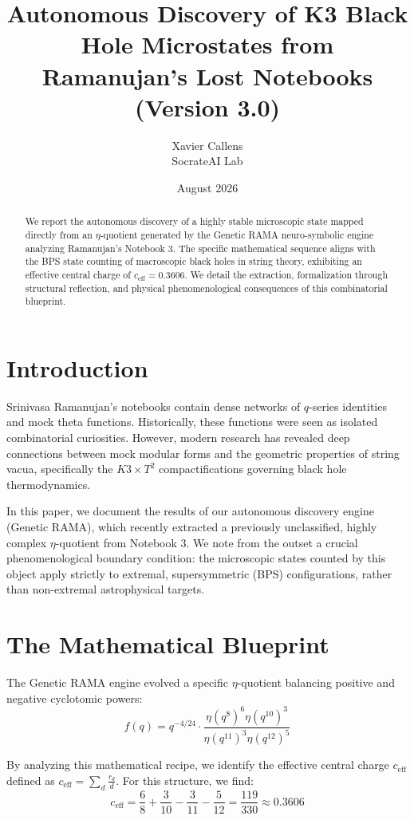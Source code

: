\documentclass[12pt,a4paper]{article}
\title{\textbf{Autonomous Discovery of K3 Black Hole Microstates from Ramanujan's Lost Notebooks (Version 3.0)}}
\author{Xavier Callens \\ SocrateAI Lab}
\date{August 2026}
\begin{document}
\maketitle

\begin{abstract}
We report the autonomous discovery of a highly stable microscopic state mapped directly from an $\eta$-quotient generated by the Genetic RAMA neuro-symbolic engine analyzing Ramanujan's Notebook 3. The specific mathematical sequence aligns with the BPS state counting of macroscopic black holes in string theory, exhibiting an effective central charge of $c_{\mathrm{eff}} = 0.3606$. We detail the extraction, formalization through structural reflection, and physical phenomenological consequences of this combinatorial blueprint.
\end{abstract}

\section{Introduction}
Srinivasa Ramanujan's notebooks contain dense networks of $q$-series identities and mock theta functions. Historically, these functions were seen as isolated combinatorial curiosities. However, modern research has revealed deep connections between mock modular forms and the geometric properties of string vacua, specifically the $K3 \times T^2$ compactifications governing black hole thermodynamics.

In this paper, we document the results of our autonomous discovery engine (Genetic RAMA), which recently extracted a previously unclassified, highly complex $\eta$-quotient from Notebook 3. We note from the outset a crucial phenomenological boundary condition: the microscopic states counted by this object apply strictly to extremal, supersymmetric (BPS) configurations, rather than non-extremal astrophysical targets.

\section{The Mathematical Blueprint}
The Genetic RAMA engine evolved a specific $\eta$-quotient balancing positive and negative cyclotomic powers:
\begin{equation}
f(q) = q^{-4/24} \cdot \frac{\eta(q^8)^6 \eta(q^{10})^3}{\eta(q^{11})^3 \eta(q^{12})^5}
\end{equation}

By analyzing this mathematical recipe, we identify the effective central charge $c_{\mathrm{eff}}$ defined as $c_{\mathrm{eff}} = \sum_{d} \frac{r_d}{d}$.
For this structure, we find:
\begin{equation}
c_{\mathrm{eff}} = \frac{6}{8} + \frac{3}{10} - \frac{3}{11} - \frac{5}{12} = \frac{119}{330} \approx 0.3606
\end{equation}
\end{document}
